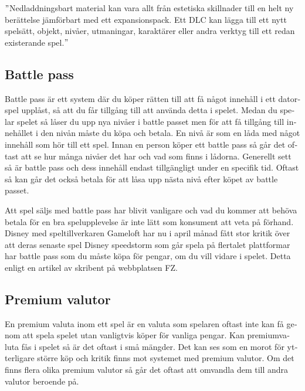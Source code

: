 \documentclass[11p]{article}
\begin{document}
\begin{otherlanguage}{swedish}
        \setlength{\leftskip}{1cm}

        \("\)Nedladdningsbart material kan vara allt från estetiska skillnader till en helt ny berättelse jämförbart med ett expansionspack.
        Ett DLC kan lägga till ett nytt spelsätt, objekt, nivåer, utmaningar, karaktärer eller andra verktyg till ett redan existerande spel.\("\) \parencite{nedladdningsbart}

        \setlength{\leftskip}{0cm}

        \subsection{Battle pass}

        Battle pass är ett system där du köper rätten till att få något innehåll i ett datorspel upplåst, så att du får tillgång till att använda detta i spelet.
        Medan du spelar spelet så låser du upp nya nivåer i battle passet men för att få tillgång till innehållet i den nivån måste du köpa och betala.
        En nivå är som en låda med något innehåll som hör till ett spel.
        Innan en person köper ett battle pass så går det oftast att se hur många nivåer det har och vad som finns i lådorna.
        Generellt sett så är battle pass och dess innehåll endast tillgängligt under en specifik tid.
        Oftast så kan går det också betala för att låsa upp nästa nivå efter köpet av battle passet.

        Att spel säljs med battle pass har blivit vanligare och vad du kommer att behöva betala för en bra spelupplevelse är inte lätt som konsument att veta på förhand.
        Disney med speltillverkaren Gameloft har nu i april månad fått stor kritik över att deras senaste spel Disney speedstorm som går spela på flertalet plattformar har battle pass som du måste köpa för pengar, om du vill vidare i spelet.
        Detta enligt en artikel av \textcite{FZ} skribent på webbplatsen FZ.

        \subsection{Premium valutor}
        En premium valuta inom ett spel är en valuta som spelaren oftast inte kan få genom att spela spelet utan vanligtvis köper för vanliga pengar.
        Kan premiumvaluta fås i spelet så är det oftast i små mängder.
        Det kan ses som en morot för ytterligare större köp och kritik finns mot systemet med premium valutor.
        Om det finns flera olika premium valutor så går det oftast att omvandla dem till andra valutor beroende på.


\end{otherlanguage}
\end{document}

